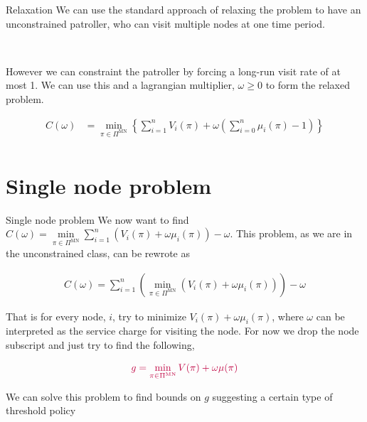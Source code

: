 \documentclass[10pt]{beamer}
\begin{document}
\begin{frame}{Relaxation}
We can use the standard approach of relaxing the problem to have an unconstrained patroller, who can visit multiple nodes at one time period.

\
\pause
\

However we can constraint the patroller by forcing a long-run visit rate of at most 1. We can use this and a lagrangian multiplier, $\omega \geq 0$ to form the relaxed problem.

\begin{align*}
C(\omega)&=\min_{\pi \in \Pi^{\text{MN}}} \left\{ \sum\limits_{i=1}^{n} V_{i}(\pi) + \omega \left( \sum\limits_{i=0}^{n} \mu_{i}(\pi) -1 \right) \right\} \\
\end{align*}
\end{frame}

\section{Single node problem}
\begin{frame}{Single node problem}
We now want to find $C(\omega)=\min\limits_{\pi \in \Pi^{\text{MN}}} \sum\limits_{i=1}^{n} (V_{i}(\pi)+\omega \mu_{i}(\pi)) - \omega$. This problem, as we are in the unconstrained class, can be rewrote as

\begin{align*}
C(\omega)=\sum\limits_{i=1}^{n} \left(\min\limits_{\pi \in \Pi^{\text{MN}}} \left(V_{i}(\pi)+\omega \mu_{i}(\pi)\right)\right) - \omega
\end{align*}

\pause
That is for every node, $i$, try to minimize $V_{i}(\pi)+\omega \mu_{i}(\pi)$, where $\omega$ can be interpreted as the service charge for visiting the node. For now we drop the node subscript and just try to find the following,

\begin{align*}
\textcolor{purple}{g=\min_{\pi \in \Pi^{\text{MN}}} V(\pi) + \omega \mu(\pi)}
\end{align*}

\pause
We can solve this problem to find bounds on $g$ suggesting a certain type of threshold policy

\end{frame}
\end{document}
